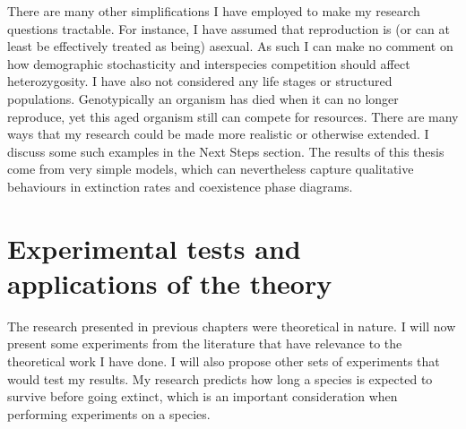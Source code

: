 There are many other simplifications I have employed to make my research questions tractable. 
For instance, I have assumed that reproduction is (or can at least be effectively treated as being) asexual. 
As such I can make no comment on how demographic stochasticity and interspecies competition should affect heterozygosity. 
I have also not considered any life stages or structured populations. 
Genotypically an organism has died when it can no longer reproduce, yet this aged organism still can compete for resources. 
There are many ways that my research could be made more realistic or otherwise extended. 
I discuss some such examples in the Next Steps section. 
The results of this thesis come from very simple models, which can nevertheless capture qualitative behaviours in extinction rates and coexistence phase diagrams. 


\section{Experimental tests and applications of the theory}

The research presented in previous chapters were theoretical in nature. 
I will now present some experiments from the literature that have relevance to the theoretical work I have done. 
I will also propose other sets of experiments that would test my results. 
My research predicts how long a species is expected to survive before going extinct, which is an important consideration when performing experiments on a species. 

